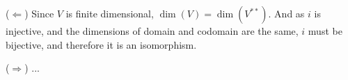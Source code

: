 ($\Leftarrow$) Since $V$ is finite dimensional, $\dim(V)=\dim(V^{**})$. And as $i$ is injective, and the dimensions of domain and codomain are the same, $i$ must be bijective, and therefore it is an isomorphism.

($\Rightarrow$) ...